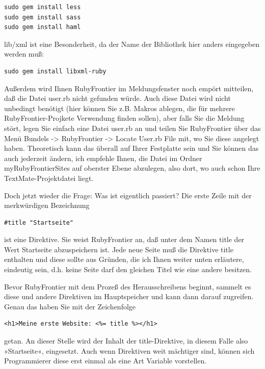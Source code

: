 \documentclass[11pt]{report}
\begin{document}
\begin{verbatim}
sudo gem install less
sudo gem install sass
sudo gem install haml
\end{verbatim}

lib/xml ist eine Besonderheit, da der Name der Bibliothek hier anders
eingegeben werden muß:



\begin{verbatim}
sudo gem install libxml-ruby
\end{verbatim}

Außerdem wird Ihnen RubyFrontier im Meldungsfenster noch empört
mitteilen, daß die Datei user.rb nicht gefunden würde. Auch diese
Datei wird nicht unbedingt benötigt (hier können Sie z.B. Makros
ablegen, die für mehrere RubyFrontier-Projkete Verwendung finden
sollen), aber falls Sie die Meldung stört, legen Sie einfach eine
Datei user.rb an und teilen Sie RubyFrontier über das Menü Bundels ->
RubyFrontier -> Locate User.rb File mit, wo Sie diese angelegt
haben. Theoretisch kann das überall auf Ihrer Festplatte sein und Sie
können das auch jederzeit ändern, ich empfehle Ihnen, die Datei im
Ordner myRubyFrontierSites auf oberster Ebene abzulegen, also dort, wo
auch schon Ihre TextMate-Projektdatei liegt.


Doch jetzt wieder die Frage: Was ist eigentlich passiert? Die erste
Zeile mit der merkwürdigen Bezeichnung


\begin{verbatim}
#title "Startseite"
\end{verbatim}

ist eine Direktive. Sie weist RubyFrontier an, daß unter dem Namen
title der Wert Startseite abzuspeichern ist. Jede neue Seite muß die
Direktive title enthalten und diese sollte aus Gründen, die ich Ihnen
weiter unten erläutere, eindeutig sein, d.h. keine Seite darf den
gleichen Titel wie eine andere besitzen.


Bevor RubyFrontier mit dem Prozeß des Herausschreibens beginnt,
sammelt es diese und andere Direktiven im Hauptspeicher und kann dann
darauf zugreifen. Genau das haben Sie mit der Zeichenfolge


\begin{verbatim}
<h1>Meine erste Website: <%= title %></h1>
\end{verbatim}

getan. An dieser Stelle wird der Inhalt der title-Direktive, in diesem
Falle also »Startseite«, eingesetzt. Auch wenn Direktiven weit
mächtiger sind, können sich Programmierer diese erst einmal als eine
Art Variable vorstellen.
\end{document}
